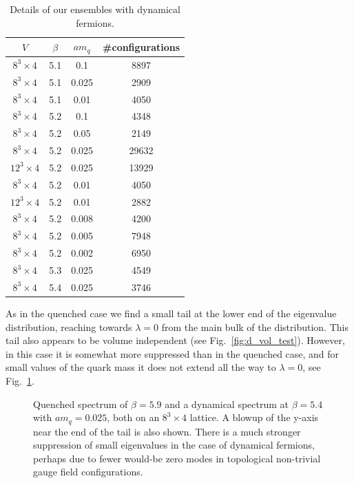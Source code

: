 \documentclass[11pt]{article}
\newcommand{\noi}{\vspace{12pt}\noindent}
\begin{document}
\begin{table}
\begin{center}
\begin{tabular}{c c c c}
$V$ & $\beta$ & $am_q$ & \#configurations \\
\hline
$8^3\times 4$ & 5.1 & 0.1 & 8897 \\
$8^3\times 4$ & 5.1 & 0.025 & 2909 \\
$8^3\times 4$ & 5.1 & 0.01 & 4050 \\
$8^3\times 4$ & 5.2 & 0.1 & 4348 \\
$8^3\times 4$ & 5.2 & 0.05 & 2149 \\
$8^3\times 4$ & 5.2 & 0.025 & 29632 \\
$12^3\times 4$ & 5.2 & 0.025 & 13929 \\
$8^3\times 4$ & 5.2 & 0.01 & 4050 \\
$12^3\times 4$ & 5.2 & 0.01 & 2882 \\
$8^3\times 4$ & 5.2 & 0.008 & 4200 \\
$8^3\times 4$ & 5.2 & 0.005 & 7948 \\
$8^3\times 4$ & 5.2 & 0.002 & 6950 \\
$8^3\times 4$ & 5.3 & 0.025 & 4549 \\
$8^3\times 4$ & 5.4 & 0.025 & 3746 \\
\hline
\end{tabular}
\end{center}
\caption[a]{Details of our ensembles with dynamical fermions.}
\label{tab:d_ensemb}
\end{table}


\noi
As in the quenched case we find a small tail at the
lower end of the eigenvalue distribution, reaching towards $\lambda=0$
from the main bulk of the distribution.   This tail also appears to be
volume independent (see Fig.~\ref{fig:d_vol_test}).  However,
in this case it is somewhat more suppressed than in the quenched case,
and for small values of the quark mass it does not extend all the way 
to $\lambda=0$, see Fig.~\ref{fig:dyn_que_compare}.

\begin{figure}
\begin{center}
\textwidth
{}
\end{center}
\vspace*{-2mm}
\caption{Quenched spectrum of $\beta=5.9$ and a dynamical spectrum at
$\beta=5.4$ with $am_q=0.025$, both on an $8^3 \times 4$ lattice.
A blowup of the y-axis near the end of the tail
is also shown. There is a much stronger suppression of small eigenvalues
in the case of dynamical fermions, perhaps due to fewer would-be zero
modes in topological non-trivial gauge field configurations.}
\label{fig:dyn_que_compare}
\end{figure}
\end{document}
